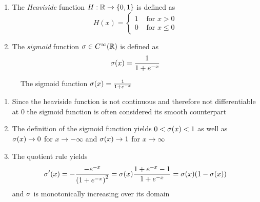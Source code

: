 \begin{definition}
    \hfill
    \begin{enumerate}
        \item The \emph{Heaviside} function \( H: \mathbb{R} \to \{ 0, 1 \} \) is defined as
              \[
                  H(x) = \left \{
                  \begin{array}{ll}
                      1 & \text{ for } x > 0  \\
                      0 & \text{ for }x \le 0
                  \end{array}
                  \right.
              \]
        \item The \emph{sigmoid} function \( \sigma \in C^\infty(\mathbb{R}) \) is defined as
              \[
                  \sigma(x) = \frac{1}{1 + e^{-x}}
              \]
    \end{enumerate}
\end{definition}
\bigskip


\begin{figure}[H]
    \centering
    \plotsigmoid{}
    \caption{The sigmoid function \( \sigma(x) = \frac{1}{1 + e^{-x}} \)}\label{fig:sigmoid}
\end{figure}
\bigskip


\begin{remarks}
    \hfill
    \begin{enumerate}
        \item Since the heaviside function is not continuous and therefore not differentiable at \( 0 \)
              the sigmoid function is often considered its smooth counterpart
        \item The definition of the sigmoid function yields \( 0 < \sigma(x) < 1 \) as well as
              \( \sigma(x) \to 0 \) for \( x \to -\infty \) and \( \sigma(x) \to 1 \) for \( x \to \infty \)
        \item The quotient rule yields
              \[
                  \sigma'(x)
                  = -\frac{-e^{-x}}{{(1 + e^{-x})}^2}
                  = \sigma(x) \frac{1 + e^{-x} - 1}{1 + e^{-x}}
                  = \sigma(x)(1 - \sigma(x))
              \]
              and \( \sigma \) is monotonically increasing over its domain
    \end{enumerate}
\end{remarks}
\bigskip
